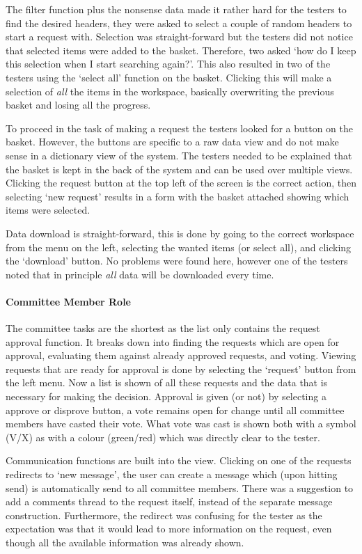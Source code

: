 The filter function plus the nonsense data made it rather hard for the testers to find the desired headers, they were asked to select a couple of random headers to start a request with.
Selection was straight-forward but the testers did not notice that selected items were added to the basket.
Therefore, two asked `how do I keep this selection when I start searching again?'.
This also resulted in two of the testers using the `select all' function on the basket. 
Clicking this will make a selection of \emph{all} the items in the workspace, basically overwriting the previous basket and losing all the progress.

To proceed in the task of making a request the testers looked for a button on the basket.
However, the buttons are specific to a raw data view and do not make sense in a dictionary view of the system.
The testers needed to be explained that the basket is kept in the back of the system and can be used over multiple views.
Clicking the request button at the top left of the screen is the correct action, then selecting `new request' results in a form with the basket attached showing which items were selected.

Data download is straight-forward, this is done by going to the correct workspace from the menu on the left, selecting the wanted items (or select all), and clicking the `download' button.
No problems were found here, however one of the testers noted that in principle \emph{all} data will be downloaded every time.

\paragraph{Committee Member Role}
The committee tasks are the shortest as the list only contains the request approval function. 
It breaks down into finding the requests which are open for approval, evaluating them against already approved requests, and voting.
Viewing requests that are ready for approval is done by selecting the `request' button from the left menu.
Now a list is shown of all these requests and the data that is necessary for making the decision.
Approval is given (or not) by selecting a approve or disprove button, a vote remains open for change until all committee members have casted their vote.
What vote was cast is shown both with a symbol (V/X) as with a colour (green/red) which was directly clear to the tester.

Communication functions are built into the view.  
Clicking on one of the requests redirects to `new message', the user can create a message which (upon hitting send) is automatically send to all committee members.
There was a suggestion to add a comments thread to the request itself, instead of the separate message construction.
Furthermore, the redirect was confusing for the tester as the expectation was that it would lead to more information on the request, even though all the available information was already shown.

